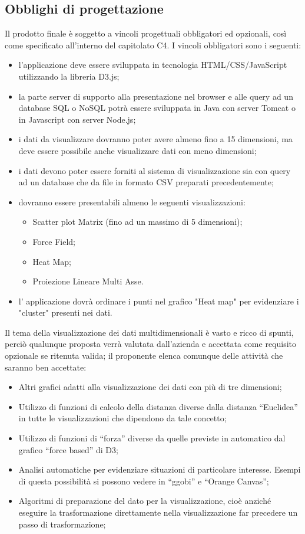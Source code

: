 \subsection{Obblighi di progettazione}
Il prodotto finale è soggetto a vincoli progettuali obbligatori ed opzionali, così
come specificato all’interno del capitolato C4.
I vincoli obbligatori sono i seguenti:
\begin{itemize}
	\item l'applicazione deve essere sviluppata in tecnologia HTML/CSS/JavaScript utilizzando la libreria D3.js;
	\item la parte server di supporto alla presentazione nel browser e alle query ad un database SQL o NoSQL
potrà essere sviluppata in Java con server Tomcat o in Javascript con server Node.js;
	\item i dati da visualizzare dovranno poter avere almeno fino a 15 dimensioni, ma deve essere possibile anche visualizzare dati con meno dimensioni;
	\item i dati devono poter essere forniti al sistema di visualizzazione sia con query ad un database che da file in formato CSV preparati precedentemente;
	\item dovranno essere presentabili almeno le seguenti visualizzazioni:
	\begin{itemize}
		\item Scatter plot Matrix (fino ad un massimo di 5 dimensioni);
		\item Force Field;
		\item Heat Map;
		\item Proiezione Lineare Multi Asse.
	\end{itemize}
	\item l' applicazione dovrà ordinare i punti nel grafico "Heat map" per evidenziare i "cluster" presenti nei dati.
\end{itemize}
Il tema della visualizzazione dei dati multidimensionali è vasto e ricco di spunti, perciò qualunque proposta verrà valutata dall'azienda e accettata come requisito opzionale se ritenuta valida; il proponente elenca comunque delle attività che saranno ben accettate:
\begin{itemize}
	\item Altri grafici adatti alla visualizzazione dei dati con più di tre dimensioni;
	\item Utilizzo di funzioni di calcolo della distanza diverse dalla distanza “Euclidea” in tutte le
visualizzazioni che dipendono da tale concetto;
	\item Utilizzo di funzioni di “forza” diverse da quelle previste in automatico dal grafico “force
based” di D3;
	\item Analisi automatiche per evidenziare situazioni di particolare interesse. Esempi di questa
possibilità si possono vedere in “ggobi” e “Orange Canvas”;
	\item Algoritmi di preparazione del dato per la visualizzazione, cioè anziché eseguire la
trasformazione direttamente nella visualizzazione far precedere un passo di trasformazione;
\end{itemize}